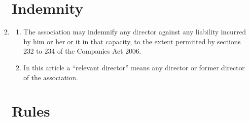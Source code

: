 \begin{enumerate}
\section{Indemnity}

\item \label{cls:directors-indemnity}
  \begin{enumerate}
  \item
    The association may indemnify any director against any
    liability incurred by him or her or it in that capacity, to the
    extent permitted by sections 232 to 234 of the Companies Act 2006.
  \item
    In this article a ``relevant director'' means any director or
    former director of the association.
  \end{enumerate}

\section{Rules}


\end{enumerate}
